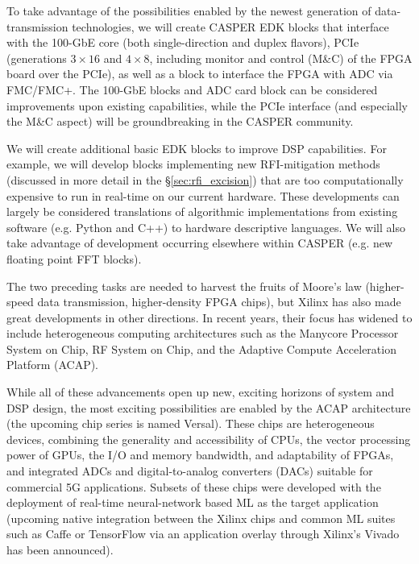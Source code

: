 \documentclass[10pt]{myNSF}
\begin{document}
 To take advantage of the
possibilities enabled by the newest generation of data-transmission
technologies, we will create CASPER EDK blocks that interface with the
100-GbE core (both single-direction and duplex flavors), PCIe
(generations $3 \times 16$ and $4 \times 8$, including monitor and
control (M\&C) of the FPGA board over the PCIe), as well as a block to
interface the FPGA with ADC via FMC/FMC+.  The 100-GbE blocks and ADC
card block can be considered improvements upon existing capabilities,
while the PCIe interface (and especially the M\&C aspect) will be
groundbreaking in the CASPER community.

 We will create additional basic EDK
blocks to improve DSP capabilities.  For example, we will develop
blocks implementing new RFI-mitigation methods (discussed in more
detail in the \S\ref{sec:rfi_excision}) that are too computationally
expensive to run in real-time on our current hardware. These
developments can largely be considered translations of algorithmic
implementations from existing software (e.g. Python and C++) to
hardware descriptive languages.  We will also take advantage of
development occurring elsewhere within CASPER (e.g. new floating point
FFT blocks).

 The two preceding tasks are
needed to harvest the fruits of Moore's law (higher-speed data
transmission, higher-density FPGA chips), but Xilinx has also made
great developments in other directions.  In recent years, their focus
has widened to include heterogeneous computing architectures such as
the Manycore Processor System on Chip, RF System on Chip, and the
Adaptive Compute Acceleration Platform (ACAP).

While all of these advancements open up new, exciting horizons of
system and DSP design, the most exciting possibilities are enabled by
the ACAP architecture (the upcoming chip series is named
Versal). These chips are heterogeneous devices, combining the
generality and accessibility of CPUs, the vector processing power of
GPUs, the I/O and memory bandwidth, and adaptability of FPGAs, and
integrated ADCs and digital-to-analog converters (DACs) suitable for
commercial 5G applications.  Subsets of these chips were developed
with the deployment of real-time neural-network based ML as the target
application (upcoming native integration between the Xilinx chips and
common ML suites such as Caffe or TensorFlow via an application
overlay through Xilinx’s Vivado has been announced).
\end{document}
